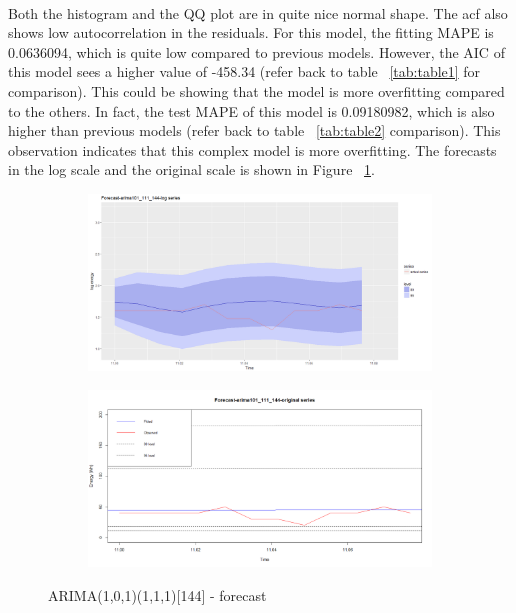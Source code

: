 \documentclass[12pt]{article}
\begin{document}
\paragraph{}
Both the histogram and the QQ plot are in quite nice normal shape. The acf also shows low autocorrelation in the residuals. For this model, the fitting MAPE is 0.0636094, which is quite low compared to previous models. However, the AIC of this model sees a higher value of -458.34 (refer back to table ~\ref{tab:table1} for comparison). This could be showing that the model is more overfitting compared to the others. In fact, the test MAPE of this model is 0.09180982, which is also higher than previous models (refer back to table ~\ref{tab:table2} comparison). This observation indicates that this complex model is more overfitting. The forecasts in the log scale and the original scale is shown in Figure ~\ref{fig:figure16}.
\begin{figure}[H]
  \centering
  \begin{subfigure}[b]{1\linewidth}
    \includegraphics[width=\linewidth]{figure15-5.png}
  \end{subfigure}
  \begin{subfigure}[b]{1\linewidth}
    \includegraphics[width=\linewidth]{figure15-6.png}
  \end{subfigure}
  \caption{ARIMA(1,0,1)(1,1,1)[144] - forecast}
  \label{fig:figure16}
\end{figure}
\end{document}
